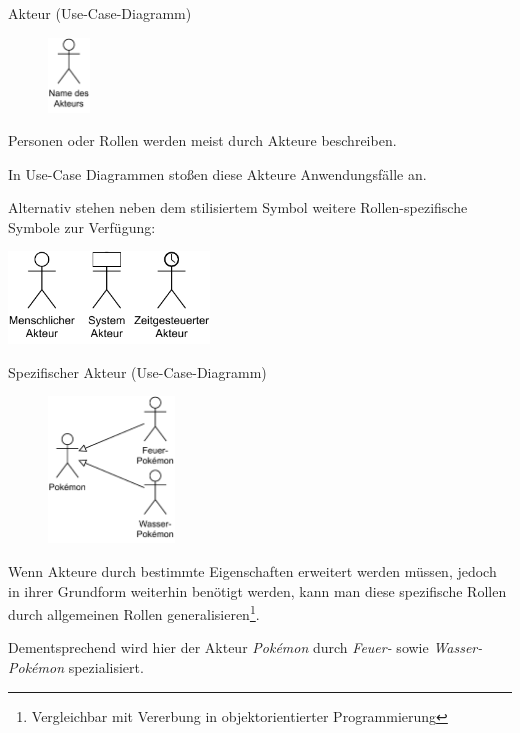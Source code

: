 \begin{defi}{Akteur (Use-Case-Diagramm)}
    \begin{figure}
        \centering
        \includegraphics[width=0.1\textwidth]{includes/figures/defi_diagrams_use_case_akteur.pdf}
    \end{figure}
    Personen oder Rollen werden meist durch Akteure beschreiben.

    In Use-Case Diagrammen stoßen diese Akteure Anwendungsfälle an.

    Alternativ stehen neben dem stilisiertem Symbol weitere Rollen-spezifische Symbole zur Verfügung:

    \begin{center}
        \includegraphics[width=0.4\textwidth]{includes/figures/defi_diagrams_use_case_akteur_types.pdf}
    \end{center}
\end{defi}

\begin{bonus}{Spezifischer Akteur (Use-Case-Diagramm)}
    \begin{figure}
        \centering
        \includegraphics[width=0.3\textwidth]{includes/figures/bonus_diagrams_use_case_akteur_specification.pdf}
    \end{figure}
    Wenn Akteure durch bestimmte Eigenschaften erweitert werden müssen, jedoch in ihrer Grundform weiterhin benötigt werden, kann man diese spezifische Rollen durch allgemeinen Rollen generalisieren\footnote{Vergleichbar mit Vererbung in objektorientierter Programmierung}.

    Dementsprechend wird hier der Akteur \emph{Pokémon} durch \emph{Feuer-} sowie \emph{Wasser-Pokémon} spezialisiert.

    \vspace{7em}
\end{bonus}

